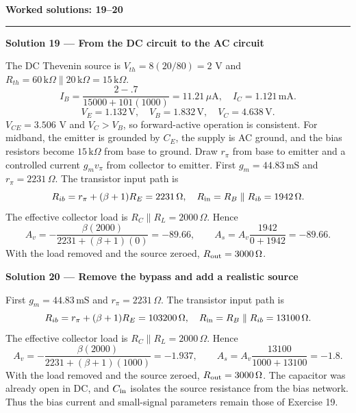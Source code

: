\documentclass[11pt,a4paper]{article}
\newcommand{\K}{\,\mathrm{k}\Omega}\newcommand{\Oh}{\,\Omega}\newcommand{\mS}{\,\mathrm{mS}}
\newcommand{\head}[1]{\par{\Large\bfseries\color{ink}#1}\par\vspace{3pt}\hrule\vspace{7pt}}
\newcommand{\sol}[2]{\par{\large\bfseries\color{ink}Solution #1 --- #2}\label{sol:#1}\par}
\begin{document}
\newpage
\head{Worked solutions: 19--20}
\sol{19}{From the DC circuit to the AC circuit}The DC Thevenin source is $V_{th}=8(20/80)=2$ V and $R_{th}=60\K\parallel20\K=15\K$.
\[I_B=\frac{2-.7}{15000+101(1000)}=11.21\,\mu\mathrm A,\quad I_C=1.121\,\mathrm{mA}.\]
\[V_E=1.132\,\mathrm V,\quad V_B=1.832\,\mathrm V,\quad V_C=4.638\,\mathrm V.\]
$V_{CE}=3.506$ V and $V_C>V_B$, so forward-active operation is consistent. For midband, the emitter is grounded by $C_E$, the supply is AC ground, and the bias resistors become $15\K$ from base to ground. Draw $r_\pi$ from base to emitter and a controlled current $g_mv_\pi$ from collector to emitter. First $g_m=44.83\mS$ and $r_\pi=2231\Oh$. The transistor input path is
\[R_{ib}=r_\pi+(\beta+1)R_E=2231\Oh,\quad R_{\rm in}=R_B\parallel R_{ib}=1942\Oh.\]
The effective collector load is $R_C\parallel R_L=2000\Oh$. Hence
\[A_v=-\frac{\beta(2000)}{2231+(\beta+1)(0)}=-89.66,\qquad
A_s=A_v\frac{1942}{0+1942}=-89.66.\]
With the load removed and the source zeroed, $R_{\rm out}=3000\Oh$.\par\vfill
\sol{20}{Remove the bypass and add a realistic source}First $g_m=44.83\mS$ and $r_\pi=2231\Oh$. The transistor input path is
\[R_{ib}=r_\pi+(\beta+1)R_E=103200\Oh,\quad R_{\rm in}=R_B\parallel R_{ib}=13100\Oh.\]
The effective collector load is $R_C\parallel R_L=2000\Oh$. Hence
\[A_v=-\frac{\beta(2000)}{2231+(\beta+1)(1000)}=-1.937,\qquad
A_s=A_v\frac{13100}{1000+13100}=-1.8.\]
With the load removed and the source zeroed, $R_{\rm out}=3000\Oh$. The capacitor was already open in DC, and $C_{\rm in}$ isolates the source resistance from the bias network. Thus the bias current and small-signal parameters remain those of Exercise 19.\par\vfill
\end{document}
